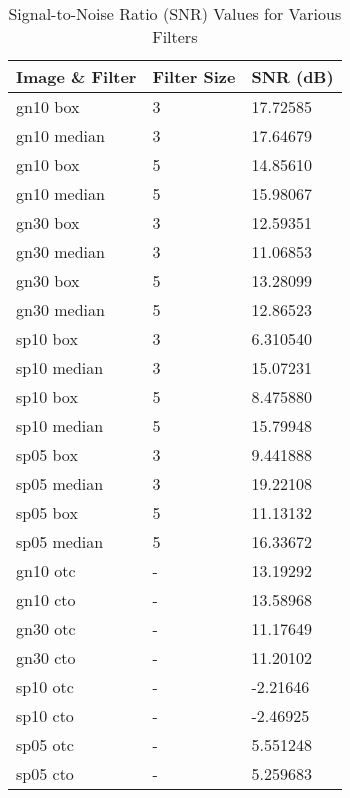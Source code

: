 \documentclass{article}
\begin{document}
\begin{table}[ht]
\centering
\caption{Signal-to-Noise Ratio (SNR) Values for Various Filters}
\begin{tabular}{|l|l|l|}
\hline
\textbf{Image \& Filter} & \textbf{Filter Size} & \textbf{SNR (dB)} \\ \hline

gn10 box & 3 & 17.72585 \\ \hline
gn10 median & 3 & 17.64679 \\ \hline
gn10 box & 5 & 14.85610 \\ \hline
gn10 median & 5 & 15.98067 \\ \hline
gn30 box & 3 & 12.59351 \\ \hline
gn30 median & 3 & 11.06853 \\ \hline
gn30 box & 5 & 13.28099 \\ \hline
gn30 median & 5 & 12.86523 \\ \hline
sp10 box & 3 & 6.310540 \\ \hline
sp10 median & 3 & 15.07231 \\ \hline
sp10 box & 5 & 8.475880 \\ \hline
sp10 median & 5 & 15.79948 \\ \hline
sp05 box & 3 & 9.441888 \\ \hline
sp05 median & 3 & 19.22108 \\ \hline
sp05 box & 5 & 11.13132 \\ \hline
sp05 median & 5 & 16.33672 \\ \hline
gn10 otc & - & 13.19292 \\ \hline
gn10 cto & - & 13.58968 \\ \hline
gn30 otc & - & 11.17649 \\ \hline
gn30 cto & - & 11.20102 \\ \hline
sp10 otc & - & -2.21646 \\ \hline
sp10 cto & - & -2.46925 \\ \hline
sp05 otc & - & 5.551248 \\ \hline
sp05 cto & - & 5.259683 \\ \hline

\end{tabular}
\end{table}
\end{document}
